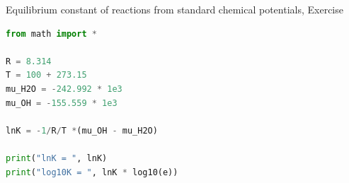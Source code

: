 %
\begin{frame}[fragile]{Equilibrium constant of reactions from standard chemical potentials, Exercise}
%	
\begin{lstlisting}[language=Python, caption=Calculating equilibrium constant of reactions using Python]
from math import *

R = 8.314
T = 100 + 273.15
mu_H2O = -242.992 * 1e3
mu_OH = -155.559 * 1e3

lnK = -1/R/T *(mu_OH - mu_H2O)

print("lnK = ", lnK)
print("log10K = ", lnK * log10(e))
\end{lstlisting}
\end{frame}
%
%
